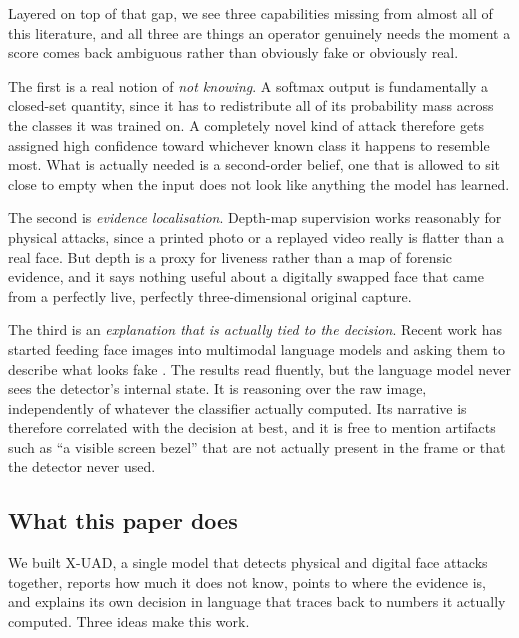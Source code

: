 \documentclass[conference]{IEEEtran}
\begin{document}
Layered on top of that gap, we see three capabilities missing from almost all of
this literature, and all three are things an operator genuinely needs the moment a
score comes back ambiguous rather than obviously fake or obviously real.

The first is a real notion of \emph{not knowing}. A softmax output is fundamentally
a closed-set quantity, since it has to redistribute all of its probability mass
across the classes it was trained on. A completely novel kind of attack therefore
gets assigned high confidence toward whichever known class it happens to resemble
most. What is actually needed is a second-order belief, one that is allowed to sit
close to empty when the input does not look like anything the model has learned.

The second is \emph{evidence localisation}. Depth-map supervision
\cite{liu2018auxiliary,yu2021revisiting} works reasonably for physical attacks,
since a printed photo or a replayed video really is flatter than a real face. But
depth is a proxy for liveness rather than a map of forensic evidence, and it says
nothing useful about a digitally swapped face that came from a perfectly live,
perfectly three-dimensional original capture.

The third is an \emph{explanation that is actually tied to the decision}. Recent
work has started feeding face images into multimodal language models and asking
them to describe what looks fake \cite{huang2024ffaa,guo2025m2f2det}. The results
read fluently, but the language model never sees the detector's internal state. It
is reasoning over the raw image, independently of whatever the classifier actually
computed. Its narrative is therefore correlated with the decision at best, and it
is free to mention artifacts such as ``a visible screen bezel'' that are not
actually present in the frame or that the detector never used.

\subsection{What this paper does}
We built X-UAD, a single model that detects physical and digital face attacks
together, reports how much it does not know, points to where the evidence is, and
explains its own decision in language that traces back to numbers it actually
computed. Three ideas make this work.
\end{document}
